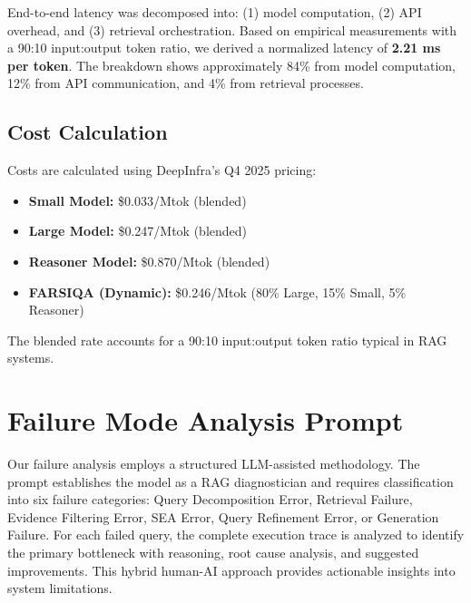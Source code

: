 \documentclass[11pt]{article}
\begin{document}
End-to-end latency was decomposed into: (1) model computation, (2) API overhead, and (3) retrieval orchestration. Based on empirical measurements with a 90:10 input:output token ratio, we derived a normalized latency of \textbf{2.21 ms per token}. The breakdown shows approximately 84\% from model computation, 12\% from API communication, and 4\% from retrieval processes.

\subsection{Cost Calculation}

Costs are calculated using DeepInfra's Q4 2025 pricing:
\begin{itemize}
    \item \textbf{Small Model:} \$0.033/Mtok (blended)
    \item \textbf{Large Model:} \$0.247/Mtok (blended)
    \item \textbf{Reasoner Model:} \$0.870/Mtok (blended)
    \item \textbf{FARSIQA (Dynamic):} \$0.246/Mtok (80\% Large, 15\% Small, 5\% Reasoner)
\end{itemize}

The blended rate accounts for a 90:10 input:output token ratio typical in RAG systems.

\section{Failure Mode Analysis Prompt}
\label{sec:appendix-failure}

Our failure analysis employs a structured LLM-assisted methodology. The prompt establishes the model as a RAG diagnostician and requires classification into six failure categories: Query Decomposition Error, Retrieval Failure, Evidence Filtering Error, SEA Error, Query Refinement Error, or Generation Failure. For each failed query, the complete execution trace is analyzed to identify the primary bottleneck with reasoning, root cause analysis, and suggested improvements. This hybrid human-AI approach provides actionable insights into system limitations.
\end{document}
